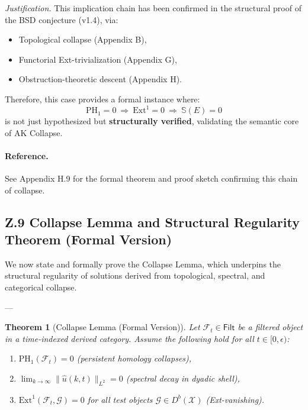 \documentclass[11pt]{article}
\newcommand{\Sha}{\mathbb{S}}
\newtheorem{theorem}{Theorem}[section]
\begin{document}
\begin{axiom}
\begin{axiom}
{{\textit{Justification.}  
This implication chain has been confirmed in the structural proof of the BSD conjecture (v1.4),  
via:
\begin{itemize}
  \item Topological collapse (Appendix B),
  \item Functorial Ext-trivialization (Appendix G),
  \item Obstruction-theoretic descent (Appendix H).
\end{itemize}

Therefore, this case provides a formal instance where:
\[
\boxed{\mathrm{PH}_1 = 0 \ \Rightarrow \ \mathrm{Ext}^1 = 0 \ \Rightarrow \ \Sha(E) = 0}
\]
is not just hypothesized but \textbf{structurally verified}, validating the semantic core of AK Collapse.

\paragraph{Reference.}  
See Appendix H.9 for the formal theorem and proof sketch confirming this chain of collapse.



\subsection*{Z.9 Collapse Lemma and Structural Regularity Theorem (Formal Version)}

We now state and formally prove the Collapse Lemma, which underpins the structural regularity  
of solutions derived from topological, spectral, and categorical collapse.

---

\begin{theorem}[Collapse Lemma (Formal Version)]
\label{thm:collapse}
Let \( \mathcal{F}_t \in \mathsf{Filt} \) be a filtered object in a time-indexed derived category.  
Assume the following hold for all \( t \in [0, \epsilon) \):

\begin{enumerate}
    \item[(1)] \( \mathrm{PH}_1(\mathcal{F}_t) = 0 \) (persistent homology collapses),
    \item[(2)] \( \lim_{k \to \infty} \| \widehat{u}(k, t) \|_{L^2} = 0 \) (spectral decay in dyadic shell),
    \item[(3)] \( \mathrm{Ext}^1(\mathcal{F}_t, \mathcal{G}) = 0 \) for all test objects \( \mathcal{G} \in D^b(\mathcal{X}) \) (Ext-vanishing).
\end{enumerate}


\end{theorem}}}
\end{axiom}
\end{axiom}
\end{document}
